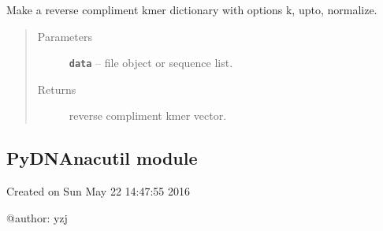 \documentclass[letterpaper,10pt,english]{sphinxmanual}
\begin{document}

\begin{fulllineitems}
\label{reference/PyDNAnac:PyDNAnac.GetRevcKmer}
Make a reverse compliment kmer dictionary with options k, upto, normalize.
\begin{quote}\begin{description}
\item[{Parameters}] \leavevmode
\textbf{\texttt{data}} -- file object or sequence list.

\item[{Returns}] \leavevmode
reverse compliment kmer vector.

\end{description}\end{quote}

\end{fulllineitems}



\subsection{PyDNAnacutil module}
\label{reference/PyDNAnacutil:module-PyDNAnacutil}\label{reference/PyDNAnacutil:pydnanacutil-module}\label{reference/PyDNAnacutil::doc}
Created on Sun May 22 14:47:55 2016

@author: yzj

\begin{fulllineitems}
\label{reference/PyDNAnacutil:PyDNAnacutil.ComputeBinNum}
\end{fulllineitems}


\begin{fulllineitems}
\label{reference/PyDNAnacutil:PyDNAnacutil.ComputeQuantileBoundaries}
\end{fulllineitems}

\end{document}
